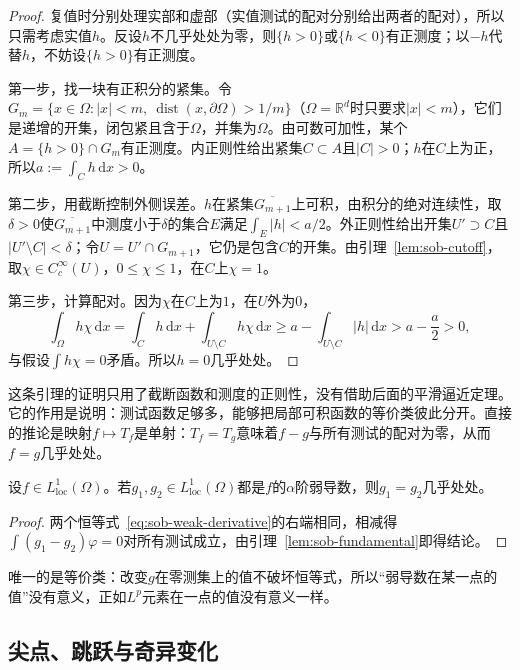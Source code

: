 \begin{proof}
复值时分别处理实部和虚部（实值测试的配对分别给出两者的配对），所以只需考虑实值$h$。反设$h$不几乎处处为零，则$\{h>0\}$或$\{h<0\}$有正测度；以$-h$代替$h$，不妨设$\{h>0\}$有正测度。

第一步，找一块有正积分的紧集。令$G_m=\{x\in\Omega:|x|<m,\ \operatorname{dist}(x,\partial\Omega)>1/m\}$（$\Omega=\mathbb R^d$时只要求$|x|<m$），它们是递增的开集，闭包紧且含于$\Omega$，并集为$\Omega$。由可数可加性，某个$A=\{h>0\}\cap G_m$有正测度。内正则性给出紧集$C\subset A$且$|C|>0$；$h$在$C$上为正，所以$a:=\int_Ch\,\mathrm dx>0$。

第二步，用截断控制外侧误差。$h$在紧集$\overline{G_{m+1}}$上可积，由积分的绝对连续性，取$\delta>0$使$\overline{G_{m+1}}$中测度小于$\delta$的集合$E$满足$\int_E|h|<a/2$。外正则性给出开集$U'\supset C$且$|U'\setminus C|<\delta$；令$U=U'\cap G_{m+1}$，它仍是包含$C$的开集。由引理~\ref{lem:sob-cutoff}，取$\chi\in C_c^\infty(U)$，$0\le\chi\le1$，在$C$上$\chi=1$。

第三步，计算配对。因为$\chi$在$C$上为$1$，在$U$外为$0$，
\[
 \int_\Omega h\chi\,\mathrm dx=\int_Ch\,\mathrm dx+\int_{U\setminus C}h\chi\,\mathrm dx
 \ge a-\int_{U\setminus C}|h|\,\mathrm dx>a-\frac a2>0 ,
\]
与假设$\int h\chi=0$矛盾。所以$h=0$几乎处处。
\end{proof}

这条引理的证明只用了截断函数和测度的正则性，没有借助后面的平滑逼近定理。它的作用是说明：测试函数足够多，能够把局部可积函数的等价类彼此分开。直接的推论是映射$f\mapsto T_f$是单射：$T_f=T_g$意味着$f-g$与所有测试的配对为零，从而$f=g$几乎处处。

\begin{theorem}[弱导数的唯一性]
\label{thm:sob-weak-derivative-unique}
设$f\in L^1_{\mathrm{loc}}(\Omega)$。若$g_1,g_2\in L^1_{\mathrm{loc}}(\Omega)$都是$f$的$\alpha$阶弱导数，则$g_1=g_2$几乎处处。
\end{theorem}

\begin{proof}
两个恒等式~\eqref{eq:sob-weak-derivative}的右端相同，相减得$\int(g_1-g_2)\varphi=0$对所有测试成立，由引理~\ref{lem:sob-fundamental}即得结论。
\end{proof}

唯一的是等价类：改变$g$在零测集上的值不破坏恒等式，所以“弱导数在某一点的值”没有意义，正如$L^p$元素在一点的值没有意义一样。

\subsection{尖点、跳跃与奇异变化}
\label{sec:sob-kinks-jumps}


